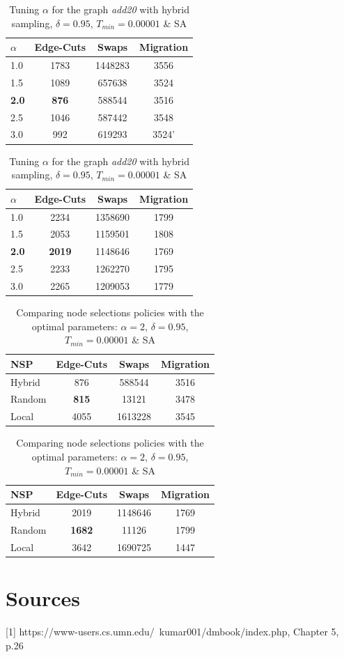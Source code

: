 \documentclass[a4paper, 11pt]{article}
\begin{document}
\begin{table}[H]
	\parbox{.4\linewidth}{
		\centering
		\begin{tabular}{|l|c|c|c|} 
			\hline
			$\alpha$ & Edge-Cuts &  Swaps & Migration  \\\hline
			1.0  & 1783 & 1448283 & 3556 \\
			1.5 & 1089 & 657638 & 3524 \\
			\textbf{2.0} & \textbf{876} & 588544 & 3516\\
			 2.5 & 1046 & 587442 & 3548 \\
			 3.0 & 992 & 619293 & 3524'\\
			\hline
		\end{tabular}
		\caption{Tuning $\alpha$ for the graph \textit{3elt} with hybrid sampling, $\delta=0.98$, $T_{min} = 0.0000001$ \& SA}
		\label{tab:3elt_alpha}}
	\hfill
	\parbox{.4\linewidth}{
		\centering
		\begin{tabular}{|l|c|c|c|} 
			\hline
			$\alpha$ & Edge-Cuts &  Swaps & Migration  \\\hline
			1.0  & 2234 & 1358690 & 1799 \\
			 1.5 & 2053 & 1159501 & 1808 \\
			 \textbf{2.0} & \textbf{2019} & 1148646 & 1769 \\
			 2.5 & 2233 & 1262270 & 1795 \\
			 3.0 & 2265 & 1209053 & 1779 \\
			\hline
		\end{tabular}
		\caption{Tuning $\alpha$ for the graph \textit{add20} with hybrid sampling, $\delta=0.95$, $T_{min} = 0.00001$ \& SA}
		\label{tab:add20_alpha}}
\end{table}



\begin{table}[H]
	\centering
	\parbox{.35\linewidth}{
		\begin{tabular}{|l|c|c|c|} 
			\hline
			NSP & Edge-Cuts &  Swaps & Migration  \\\hline
			Hybrid & 876 & 588544 & 3516\\
			Random & \textbf{815} & 13121 & 3478\\
			Local &  4055 & 1613228& 3545 \\
			\hline
		\end{tabular}
		\caption{Comparing node selections policies with the optimal parameters: $\alpha=2$, $\delta=0.99$, $T_{min}=0.0000001$ \& SA}
		\label{tab:3elt_nodepolicy}}
	\hfill
	\parbox{.35\linewidth}{
		\centering
		\begin{tabular}{|l|c|c|c|} 
			\hline
			NSP & Edge-Cuts &  Swaps & Migration  \\\hline
			Hybrid & 2019 & 1148646 & 1769 \\
			Random & \textbf{1682} & 11126 & 1799	\\	
			Local & 3642 & 1690725 & 1447\\
			\hline
		\end{tabular}
		\caption{Comparing node selections policies with the optimal parameters: $\alpha=2$, $\delta=0.95$, $T_{min}=0.00001$ \& SA}
		\label{tab:add20_nodepolicy}}
	
\end{table}


\section{Sources}
[1] https://www-users.cs.umn.edu/~kumar001/dmbook/index.php, Chapter 5, p.26
\end{document}
